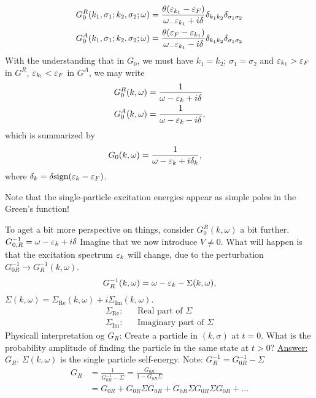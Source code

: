 \begin{align} 
G_0^R(k_1, \sigma_1;k_2, \sigma_2;\omega) &= \frac{\theta(\varepsilon_{k_1}-\varepsilon_F)}{\omega_-\varepsilon_{k_1} + i\delta}\delta_{k_1k_2}\delta_{\sigma_1\sigma_2}\\
G_0^A(k_1, \sigma_1;k_2, \sigma_2;\omega) &= \frac{\theta(\varepsilon_F - \varepsilon_{k_1})}{\omega_-\varepsilon_{k_1} - i\delta}\delta_{k_1k_2}\delta_{\sigma_1\sigma_2}
\end{align}
With the understanding that in $G_0$, we must have $k_1 = k_2$; $\sigma_1 = \sigma_2$ and $\varepsilon_{k_1}>\varepsilon_F$ in $G^R$, $\varepsilon_{k_!}<\varepsilon_F$ in $G^A$, we may write
\begin{align} 
G_0^R(k, \omega) &= \frac{1}{\omega -\varepsilon_k + i\delta} \\
G_0^A(k, \omega) &= \frac{1}{\omega -\varepsilon_k -i\delta},
\end{align}
which is summarized by
\begin{align} 
G_0(k, \omega) &= \frac{1}{\omega-\varepsilon_k + i\delta_k},
\end{align}
where $\delta_k = \delta\text{sign}(\varepsilon_k - \varepsilon_F)$.
\begin{tcolorbox}
	Note that the single-particle excitation energies appear as simple poles in the Green's function!
\end{tcolorbox}
To aget a bit more perspective on things, consider $G_0^R (k,\omega)$ a bit further. $G_{0,R}^{-1} = \omega-\varepsilon_k+i\delta$
Imagine that we now introduce $V \ne 0$. What will happen is that the excitation spectrum $\varepsilon_k$ will change, due to the perturbation $G_{0R}^{-1} \rightarrow G_R^{-1}(k,\omega)$.
\begin{equation} 
G_R^{-1}(k,\omega) = \omega -\varepsilon_k -\Sigma(k,\omega),
\end{equation}
$\Sigma(k,\omega) = \Sigma_{\text{Re}}(k,\omega) + i\Sigma_{\text{Im}}(k,\omega)$.
\begin{align*} 
\Sigma_{\text{Re}}: && \text{Real part of } \Sigma \\
\Sigma_{\text{Im}}: && \text{Imaginary part of } \Sigma
\end{align*}
Physicall interpretation og $G_R$: Create a particle in $(k,\sigma)$ at $t=0$. What is the probability amplitude of finding the particle in the same state at $t>0$? \underline{Answer: $G_R$}. $\Sigma(k,\omega)$ is the single particle self-energy.
Note: $G_R^{-1} = G_{0R}^{-1} - \Sigma$
\begin{align*} 
G_R &= \frac{1}{G_{0R}^{-1} - \Sigma} =\frac{G_{0R}}{1-G_{0R}\Sigma} \\
&= G_{0R} + G_{0R}\Sigma G_{0R} + G_{0R}\Sigma G_{0R} \Sigma G_{0R} + \dots
\end{align*}
